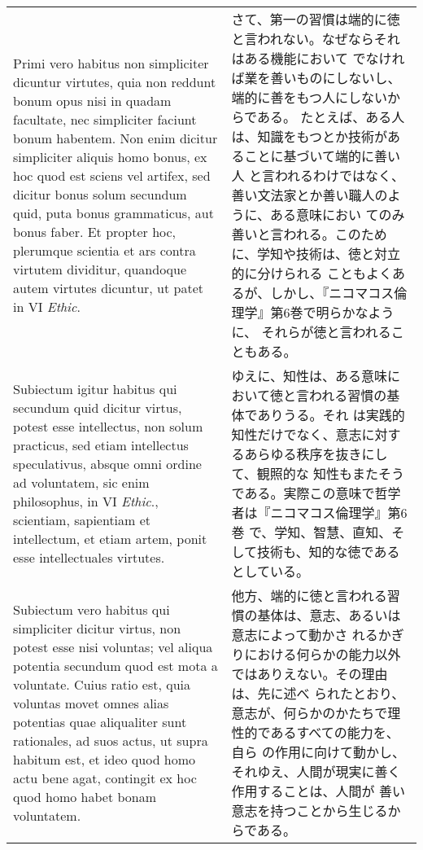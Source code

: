 \documentclass[10pt]{jsarticle}
\begin{document}
\begin{longtable}{p{21em}p{21em}}
\\

Primi vero habitus non simpliciter dicuntur virtutes, quia non reddunt
bonum opus nisi in quadam facultate, nec simpliciter faciunt bonum
habentem. Non enim dicitur simpliciter aliquis homo bonus, ex hoc quod
est sciens vel artifex, sed dicitur bonus solum secundum quid, puta
bonus grammaticus, aut bonus faber. Et propter hoc, plerumque scientia
et ars contra virtutem dividitur, quandoque autem virtutes dicuntur,
ut patet in VI {\itshape Ethic}.

&

さて、第一の習慣は端的に徳と言われない。なぜならそれはある機能において
でなければ業を善いものにしないし、端的に善をもつ人にしないからである。
たとえば、ある人は、知識をもつとか技術があることに基づいて端的に善い人
と言われるわけではなく、善い文法家とか善い職人のように、ある意味におい
てのみ善いと言われる。このために、学知や技術は、徳と対立的に分けられる
こともよくあるが、しかし、『ニコマコス倫理学』第6巻で明らかなように、
それらが徳と言われることもある。
 
\\

Subiectum igitur habitus qui secundum quid dicitur virtus, potest esse
intellectus, non solum practicus, sed etiam intellectus speculativus,
absque omni ordine ad voluntatem, sic enim philosophus, in VI
{\itshape Ethic}., scientiam, sapientiam et intellectum, et etiam
artem, ponit esse intellectuales virtutes.


&

ゆえに、知性は、ある意味において徳と言われる習慣の基体でありうる。それ
は実践的知性だけでなく、意志に対するあらゆる秩序を抜きにして、観照的な
知性もまたそうである。実際この意味で哲学者は『ニコマコス倫理学』第6巻
で、学知、智慧、直知、そして技術も、知的な徳であるとしている。
 
\\

Subiectum vero habitus qui simpliciter dicitur virtus, non potest esse
nisi voluntas; vel aliqua potentia secundum quod est mota a
voluntate. Cuius ratio est, quia voluntas movet omnes alias potentias
quae aliqualiter sunt rationales, ad suos actus, ut supra habitum est,
et ideo quod homo actu bene agat, contingit ex hoc quod homo habet
bonam voluntatem.

&

他方、端的に徳と言われる習慣の基体は、意志、あるいは意志によって動かさ
れるかぎりにおける何らかの能力以外ではありえない。その理由は、先に述べ
られたとおり、意志が、何らかのかたちで理性的であるすべての能力を、自ら
の作用に向けて動かし、それゆえ、人間が現実に善く作用することは、人間が
善い意志を持つことから生じるからである。


\end{longtable}
\end{document}
